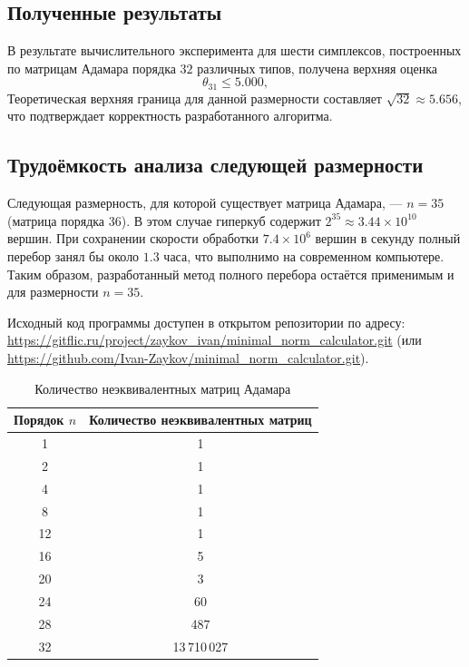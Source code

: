 \documentclass[a4paper,12pt]{article}
\theoremstyle{indented}
\begin{document}
\subsection*{Полученные результаты}

В результате вычислительного эксперимента для шести симплексов, построенных по матрицам Адамара порядка $32$ различных типов, получена верхняя оценка
\[
\theta_{31} \le 5.000,
\]
Теоретическая верхняя граница для данной размерности составляет $\sqrt{32} \approx 5.656$, что подтверждает корректность разработанного алгоритма.

\subsection*{Трудоёмкость анализа следующей размерности}

Следующая размерность, для которой существует матрица Адамара, — $n = 35$ (матрица порядка $36$). В этом случае гиперкуб содержит $2^{35} \approx 3.44 \times 10^{10}$ вершин. При сохранении скорости обработки $7.4 \times 10^6$ вершин в секунду полный перебор занял бы около $1.3$ часа, что выполнимо на современном компьютере. Таким образом, разработанный метод полного перебора остаётся применимым и для размерности $n = 35$.

Исходный код программы доступен в открытом репозитории по адресу:
\url{https://gitflic.ru/project/zaykov_ivan/minimal_norm_calculator.git} (или \url{https://github.com/Ivan-Zaykov/minimal_norm_calculator.git}).


\newpage

\begin{table}[h]
\centering
\caption{Количество неэквивалентных матриц Адамара}
\label{tab:hadamard_counts}
\begin{tabular}{|c|c|}
\hline
\textbf{Порядок $n$} & \textbf{Количество неэквивалентных матриц} \\
\hline
1 & 1 \\
\hline
2 & 1 \\
\hline
4 & 1 \\
\hline
8 & 1 \\
\hline
12 & 1 \\
\hline
16 & 5 \\
\hline
20 & 3 \\
\hline
24 & 60 \\
\hline
28 & 487 \\
\hline
32 & 13\,710\,027 \\
\hline
\end{tabular}
\end{table}
\end{document}
